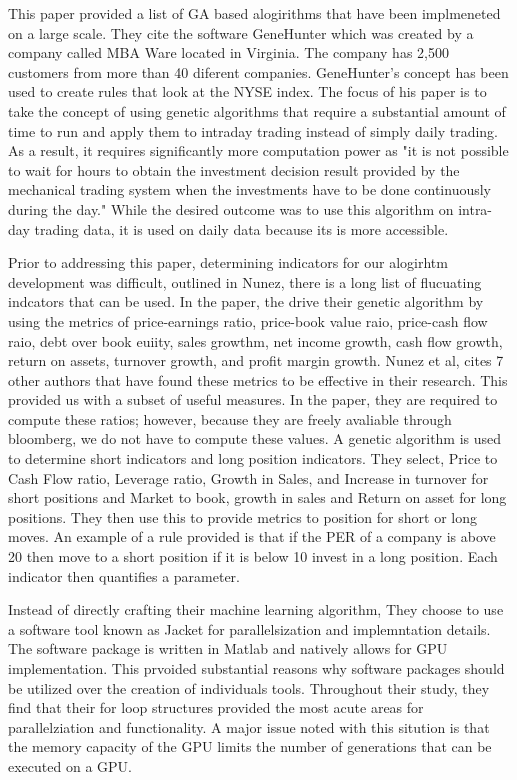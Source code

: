 \documentclass[paper=letter, fontsize=11pt]{scrartcl}
\numberwithin{equation}{section}		%
\numberwithin{figure}{section}			%
\numberwithin{table}{section}				%
\begin{document}
\begin{spacing}{2}
This paper provided a list of GA based alogirithms that have been implmeneted on a large scale. They cite the software GeneHunter which was created by a company called MBA Ware located in Virginia. The company has 2,500 customers from more than 40 diferent companies. GeneHunter's concept has been used to create rules that look at the NYSE index. The focus of his paper is to take the concept of using genetic algorithms that require a substantial amount of time to run and apply them to intraday trading instead of simply daily trading. As a result, it requires significantly more computation power as "it is not possible to wait for hours to obtain the investment decision result provided by the mechanical trading system when the investments have to be done continuously during the day." While the desired outcome was to use this algorithm on intra-day trading data, it is used on daily data because its is more accessible. 

Prior to addressing this paper, determining indicators for our alogirhtm development was difficult, outlined in Nunez\cite{GA}, there is a long list of flucuating indcators that can be used. In the paper, the drive their genetic algorithm by using the metrics of price-earnings ratio, price-book value raio, price-cash flow raio, debt over book euiity, sales growthm, net income growth, cash flow growth, return on assets, turnover growth, and profit margin growth. Nunez et al, cites  7 other authors that have found these metrics to be effective in their research. This provided us with a subset of useful measures. In the paper, they are required to compute these ratios; however, because they are freely avaliable through bloomberg, we do not have to compute these values. A genetic algorithm is used to determine short indicators and long position indicators. They select, Price to Cash Flow ratio, Leverage ratio, Growth in Sales, and Increase in turnover for short positions and Market to book, growth in sales and Return on asset for long positions. They then use this to provide metrics to position for short or long moves. An example of a rule provided is that if the PER of a company is above 20 then move to a short position if it is below 10 invest in a long position. Each indicator then quantifies a parameter. 

Instead of directly crafting their machine learning algorithm, They choose to  use a software tool known as Jacket for parallelsization and implemntation details. The software package is written in Matlab and natively allows for GPU implementation. This prvoided substantial reasons why software packages should be utilized over the creation of individuals tools. Throughout their study, they find that their for loop structures provided the most acute areas for parallelziation and functionality. A major issue noted with this sitution is that the memory capacity of the GPU limits the number of generations that can be executed on a GPU.



\end{spacing}
\end{document}
